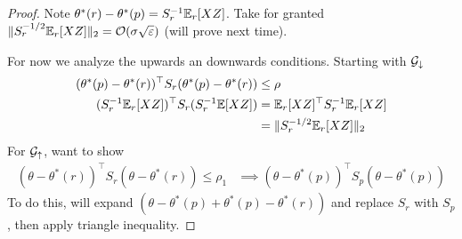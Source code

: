 \begin{proof}
  Note $\theta^*(r) - \theta^*(p) = S_r^{-1} \mathbb{E}_r[X Z]$.
  Take for granted $\| S_r^{-1/2} \mathbb{E}_r[X Z]\|_2 = \mathcal{O}(\sigma \sqrt{\varepsilon})$ (will prove next time).

  For now we analyze the upwards an downwards conditions. Starting with $\mathcal{G}_{\downarrow}$
  \begin{align}
    (\theta^*(p) - \theta^*(r))^\top S_r (\theta^*(p) - \theta^*(r)) 
    &\leq \rho \\
    (S_r^{-1} \mathbb{E}_r[X Z])^\top S_r (S_r^{-1} \mathbb{E}[X Z])
    &=  \mathbb{E}_r[X Z]^\top S_r^{-1} \mathbb{E}_r[X Z] \\
    &= \|S_r^{-1/2} \mathbb{E}_r[X Z]\|_2
  \end{align}
  For $\mathcal{G}_{\uparrow}$, want to show
  \begin{align}
    (\theta - \theta^*(r))^\top S_r (\theta - \theta^*(r)) 
    \leq \rho_1
    &\implies (\theta - \theta^*(p))^\top S_p (\theta - \theta^*(p))
  \end{align}
  To do this, will expand $(\theta - \theta^*(p) + \theta^*(p) - \theta^*(r))$
  and replace $S_r$ with $S_p$, then apply triangle inequality.
\end{proof}
